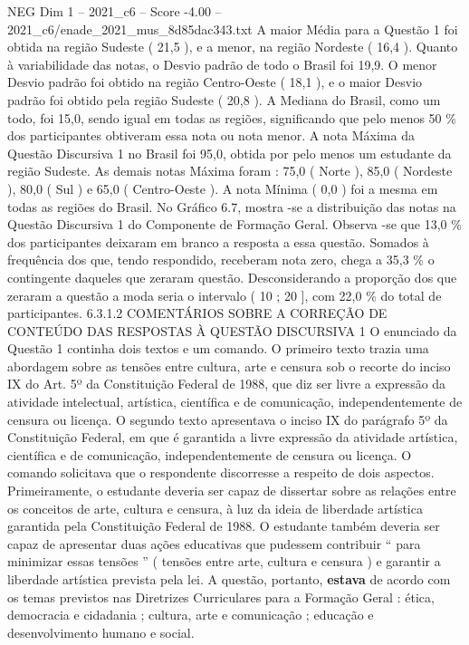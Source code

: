 \begin{textsample}{NEG Dim 1 – 2021\_c6 – Score -4.00 – 2021\_c6/enade\_2021\_mus\_8d85dac343.txt}
A maior Média para a Questão 1 foi obtida na região Sudeste ( 21,5 ), e a menor, na região Nordeste ( 16,4 ).
Quanto à variabilidade das notas, o Desvio padrão de todo o Brasil foi 19,9.
O menor Desvio padrão foi obtido na região Centro-Oeste ( 18,1 ), e o maior Desvio padrão foi obtido pela região Sudeste ( 20,8 ).
A Mediana do Brasil, como um todo, foi 15,0, sendo igual em todas as regiões, significando que pelo menos 50 \% dos participantes obtiveram essa nota ou nota menor.
A nota Máxima da Questão Discursiva 1 no Brasil foi 95,0, obtida por pelo menos um estudante da região Sudeste.
As demais notas Máxima foram : 75,0 ( Norte ), 85,0 ( Nordeste ), 80,0 ( Sul ) e 65,0 ( Centro-Oeste ).
A nota Mínima ( 0,0 ) foi a mesma em todas as regiões do Brasil.
No Gráfico 6.7, mostra -se a distribuição das notas na Questão Discursiva 1 do Componente de Formação Geral.
Observa -se que 13,0 \% dos participantes deixaram em branco a resposta a essa questão.
Somados à frequência dos que, tendo respondido, receberam nota zero, chega a 35,3 \% o contingente daqueles que zeraram questão.
Desconsiderando a proporção dos que zeraram a questão a moda seria o intervalo ( 10 ; 20 ], com 22,0 \% do total de participantes. 6.3.1.2 COMENTÁRIOS SOBRE A CORREÇÃO DE CONTEÚDO DAS RESPOSTAS À QUESTÃO DISCURSIVA 1 O enunciado da Questão 1 continha dois textos e um comando.
O primeiro texto trazia uma abordagem sobre as tensões entre cultura, arte e censura sob o recorte do inciso IX do Art. 5º da Constituição Federal de 1988, que diz ser livre a expressão da atividade intelectual, artística, científica e de comunicação, independentemente de censura ou licença.
O segundo texto apresentava o inciso IX do parágrafo 5º da Constituição Federal, em que é garantida a livre expressão da atividade artística, científica e de comunicação, independentemente de censura ou licença.
O comando solicitava que o respondente discorresse a respeito de dois aspectos.
Primeiramente, o estudante deveria ser capaz de dissertar sobre as relações entre os conceitos de arte, cultura e censura, à luz da ideia de liberdade artística garantida pela Constituição Federal de 1988.
O estudante também deveria ser capaz de apresentar duas ações educativas que pudessem contribuir “ para minimizar essas tensões ” ( tensões entre arte, cultura e censura ) e garantir a liberdade artística prevista pela lei.
A questão, portanto, \textbf{estava} de acordo com os temas previstos nas Diretrizes Curriculares para a Formação Geral : ética, democracia e cidadania ; cultura, arte e comunicação ; educação e desenvolvimento humano e social.

\end{textsample}
